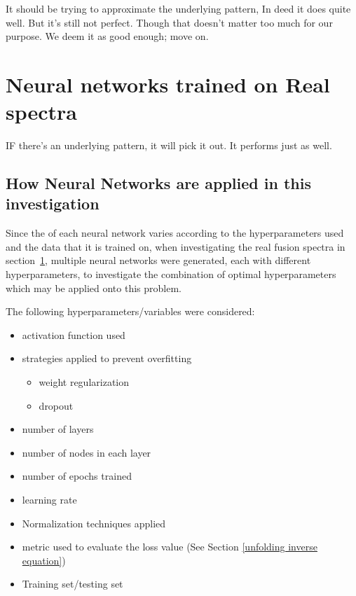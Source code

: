 \documentclass[a4paper, 12pt]{article}
\begin{document}
It should be trying to approximate the underlying pattern,
In deed it does quite well.
But it's still not perfect.
Though that doesn't matter too much for our purpose. We deem it as good enough; move on.

\section{Neural networks trained on Real spectra}\label{RealResults}

IF there's an underlying pattern, it will pick it out.
It performs just as well.

\subsection{How Neural Networks are applied in this investigation}
    
    Since the of each neural network varies according to the hyperparameters used and the data that it is trained on, when investigating the real fusion spectra in section~\ref{RealResults}, multiple neural networks were generated, each with different hyperparameters, to investigate the combination of optimal hyperparameters which may be applied onto this problem.

    The following hyperparameters/variables were considered:
    \begin{itemize}
        \item activation function used
        \item strategies applied to prevent overfitting
        \begin{itemize}
            \item weight regularization
            \item dropout
        \end{itemize}
        \item number of layers
        \item number of nodes in each layer
        \item number of epochs trained
        \item learning rate
        \item Normalization techniques applied
        \item metric used to evaluate the loss value (See Section \ref{unfolding inverse equation})
        \item Training set/testing set
    \end{itemize}
\end{document}
